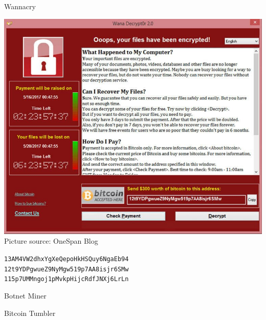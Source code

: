 \documentclass[]{beamer}
\begin{document}
\begin{frame}{Wannacry}
	\begin{center}
		\includegraphics[scale=0.28]{../assets/images/wannacry} \\
		\footnotesize{Picture source: OneSpan Blog}\\
		\vspace{1em}
	\begin{small}
	\texttt{13AM4VW2dhxYgXeQepoHkHSQuy6NgaEb94} \link \href{https://blockstream.info/address/13AM4VW2dhxYgXeQepoHkHSQuy6NgaEb94}{} \\
	\texttt{12t9YDPgwueZ9NyMgw519p7AA8isjr6SMw} \link \href{https://blockstream.info/address/12t9YDPgwueZ9NyMgw519p7AA8isjr6SMw}{} \\
	\texttt{115p7UMMngoj1pMvkpHijcRdfJNXj6LrLn} \link \href{https://blockstream.info/address/115p7UMMngoj1pMvkpHijcRdfJNXj6LrLn} {} \\
	\end{small}
	\end{center}
\end{frame}


\begin{frame}{Botnet Miner}

\end{frame}


\begin{frame}{Bitcoin Tumbler}

\end{frame}
\end{document}
